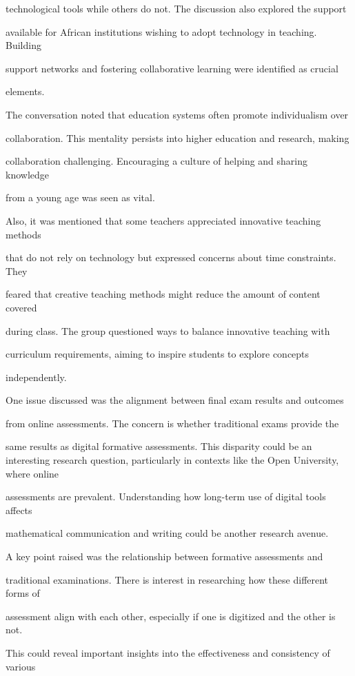 \documentclass[11pt]{article}
\begin{document}
technological tools while others do not. The discussion also explored the support

available for African institutions wishing to adopt technology in teaching. Building

support networks and fostering collaborative learning were identified as crucial

elements.

The conversation noted that education systems often promote individualism over

collaboration. This mentality persists into higher education and research, making

collaboration challenging. Encouraging a culture of helping and sharing knowledge

from a young age was seen as vital.

Also, it was mentioned that some teachers appreciated innovative teaching methods

that do not rely on technology but expressed concerns about time constraints. They

feared that creative teaching methods might reduce the amount of content covered

during class. The group questioned ways to balance innovative teaching with

curriculum requirements, aiming to inspire students to explore concepts

independently.

One issue discussed was the alignment between final exam results and outcomes

from online assessments. The concern is whether traditional exams provide the

same results as digital formative assessments. This disparity could be an interesting research question, particularly in contexts like the Open University, where online

assessments are prevalent. Understanding how long-term use of digital tools affects

mathematical communication and writing could be another research avenue.

A key point raised was the relationship between formative assessments and

traditional examinations. There is interest in researching how these different forms of

assessment align with each other, especially if one is digitized and the other is not.

This could reveal important insights into the effectiveness and consistency of various
\end{document}

